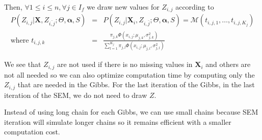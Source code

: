 \documentclass[12pt,a4paper]{report}
\begin{document}

	Then, $\forall 1\leq i \leq n, \forall j \in I_f$ we draw new values for $Z_{i,j}$ according to
	\begin{eqnarray}
		P(Z_{i,j}|\boldsymbol{X},Z_{\bar{i,j}};\Theta,\boldsymbol{\alpha},S)&=&P(Z_{i,j}|\boldsymbol{X}_i,Z_{i,\bar{j}};\Theta,\boldsymbol{\alpha},S)=\mathcal{M}(t_{i,j,1},\dots ,t_{i,j,K_j}) \\
		\textrm{where } t_{i,j,k}&=&\frac{\pi_{j,k}\Phi(x_{i,j};\mu_{j,k},\sigma_{j,k}^2)}{\sum_{l=1}^{K_j}\pi_{j,l}\Phi(x_{i,j};\mu_{j,l},\sigma_{j,l}^2) }
	\end{eqnarray}
		
	
	
	We see that $Z_{i,j}$ are not used if there is no missing values in $\boldsymbol{X}_i$ and others are not all needed so we can also optimize computation time by  computing only the $Z_{i,j}$ that are needed in the Gibbs.
	For the last iteration of the Gibbs, in the last iteration of the SEM, we do not need to draw $Z$.	
	
	Instead of using long chain for each Gibbs, we can use small chains because SEM iteration will simulate longer chains so it remains efficient with a smaller computation cost.
	
\end{document}
